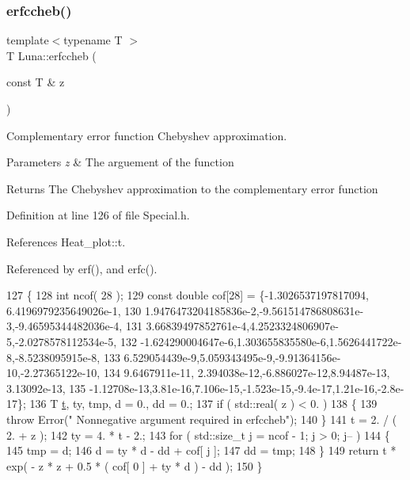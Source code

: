 \subsubsection{\texorpdfstring{erfccheb()}{erfccheb()}}
{\footnotesize\ttfamily template$<$typename T $>$ \\
T Luna\+::erfccheb (\begin{DoxyParamCaption}\item[{const T \&}]{z }\end{DoxyParamCaption})}



Complementary error function Chebyshev approximation. 


\begin{DoxyParams}{Parameters}
{\em z} & The arguement of the function \\
\hline
\end{DoxyParams}
\begin{DoxyReturn}{Returns}
The Chebyshev approximation to the complementary error function 
\end{DoxyReturn}


Definition at line 126 of file Special.\+h.



References Heat\+\_\+plot\+::t.



Referenced by erf(), and erfc().


\begin{DoxyCode}
127     \{
128       \textcolor{keywordtype}{int} ncof( 28 );
129       \textcolor{keyword}{const} \textcolor{keywordtype}{double} cof[28] = \{-1.3026537197817094, 6.4196979235649026e-1,
130         1.9476473204185836e-2,-9.561514786808631e-3,-9.46595344482036e-4,
131         3.66839497852761e-4,4.2523324806907e-5,-2.0278578112534e-5,
132         -1.624290004647e-6,1.303655835580e-6,1.5626441722e-8,-8.5238095915e-8,
133         6.529054439e-9,5.059343495e-9,-9.91364156e-10,-2.27365122e-10,
134         9.6467911e-11, 2.394038e-12,-6.886027e-12,8.94487e-13, 3.13092e-13,
135         -1.12708e-13,3.81e-16,7.106e-15,-1.523e-15,-9.4e-17,1.21e-16,-2.8e-17\};
136       T \hyperlink{namespaceHeat__plot_a25a93a2226128530145cc611f350163b}{t}, ty, tmp, d = 0., dd = 0.;
137       \textcolor{keywordflow}{if} ( std::real( z ) < 0. )
138       \{
139         \textcolor{keywordflow}{throw} Error(\textcolor{stringliteral}{" Nonnegative argument required in erfccheb"});
140       \}
141       t = 2. / ( 2. + z );
142       ty = 4. * t - 2.;
143       \textcolor{keywordflow}{for} ( std::size\_t j = ncof - 1; j > 0; j-- )
144       \{
145         tmp = d;
146         d = ty * d - dd + cof[ j ];
147         dd = tmp;
148       \}
149       \textcolor{keywordflow}{return} t * exp( - z * z + 0.5 * ( cof[ 0 ] + ty * d ) - dd );
150     \}
\end{DoxyCode}
\mbox{\label{namespaceLuna_a62f1af647be5ca8909ba79911afede93}} 
